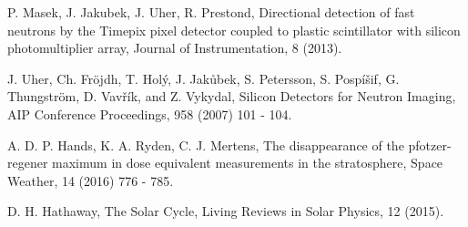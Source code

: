 \begin{thebibliography}{00}
  P. Masek, J. Jakubek, J. Uher, R. Prestond, Directional detection of fast neutrons by the Timepix pixel detector coupled to plastic scintillator with silicon photomultiplier array, Journal of Instrumentation, 8 (2013).

  J. Uher, Ch. Fröjdh, T. Holý, J. Jakůbek, S. Petersson, S. Pospíšif, G. Thungström, D. Vavřík, and Z. Vykydal, Silicon Detectors for Neutron Imaging, AIP Conference Proceedings, 958 (2007) 101 - 104.

  A. D. P. Hands, K. A. Ryden, C. J. Mertens, The disappearance of the pfotzer-regener maximum in dose equivalent measurements in the stratosphere, Space Weather, 14 (2016) 776 - 785.
  
  D. H. Hathaway, The Solar Cycle, Living Reviews in Solar Physics, 12 (2015).

\end{thebibliography}
%
%
%
%
%
%
%
%
%
%
%
